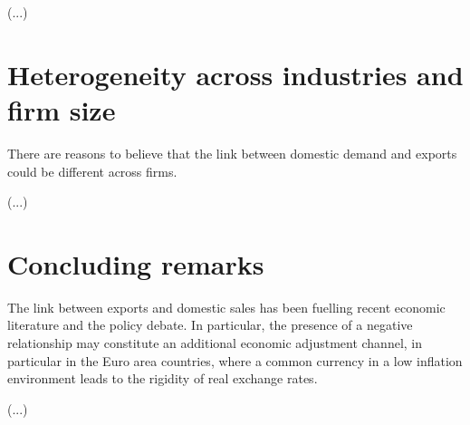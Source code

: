 \documentclass[a4paper,12pt]{article}
\begin{document}
\vspace{0.5cm}
(...)
\vspace{0.5cm}




\section{Heterogeneity across industries and firm size}\label{sec:results:industries}

There are reasons to believe that the link between domestic demand and exports could be different across firms. 

	\vspace{0.5cm}
	(...)
	\vspace{0.5cm}



\section{Concluding remarks}\label{sec:conclusion}

The link between exports and domestic sales has been fuelling recent economic literature and the policy debate. In particular, the presence of a negative relationship may constitute an additional economic adjustment channel, in particular in the Euro area countries, where a common currency in a low inflation environment leads to the rigidity of real exchange rates.


	\vspace{0.5cm}
	(...)
	\vspace{0.5cm}

      



\nocite{wooldridge1999distribution}
\nocite{vannoorenberghe2012firm}
\nocite{melitz2003impact}
\nocite{krugman1980scale}
\nocite{altomonte2013firm}



\end{document}
